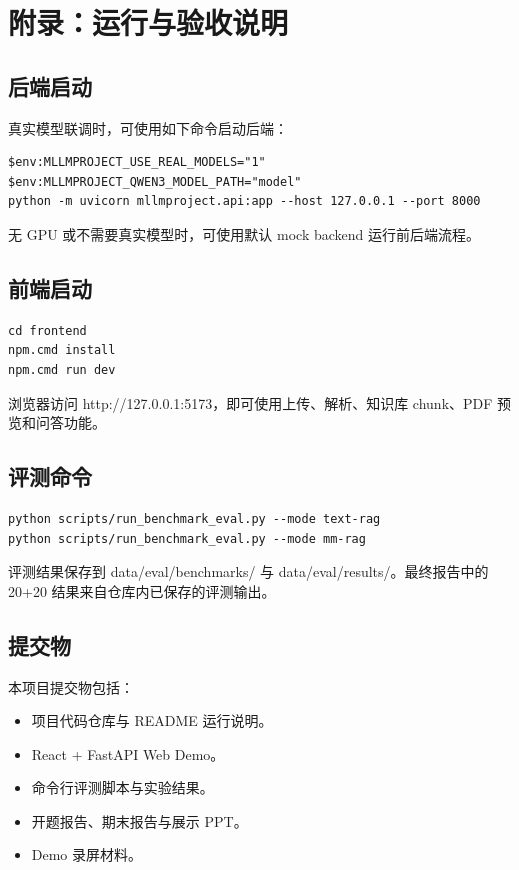 \chapter{附录：运行与验收说明}

\section{后端启动}

真实模型联调时，可使用如下命令启动后端：

\begin{lstlisting}
$env:MLLMPROJECT_USE_REAL_MODELS="1"
$env:MLLMPROJECT_QWEN3_MODEL_PATH="model"
python -m uvicorn mllmproject.api:app --host 127.0.0.1 --port 8000
\end{lstlisting}

无 GPU 或不需要真实模型时，可使用默认 mock backend 运行前后端流程。

\section{前端启动}

\begin{lstlisting}
cd frontend
npm.cmd install
npm.cmd run dev
\end{lstlisting}

浏览器访问 http://127.0.0.1:5173，即可使用上传、解析、知识库 chunk、PDF 预览和问答功能。

\section{评测命令}

\begin{lstlisting}
python scripts/run_benchmark_eval.py --mode text-rag
python scripts/run_benchmark_eval.py --mode mm-rag
\end{lstlisting}

评测结果保存到 data/eval/benchmarks/ 与 data/eval/results/。最终报告中的 20+20 结果来自仓库内已保存的评测输出。

\section{提交物}

本项目提交物包括：

\begin{itemize}
  \item 项目代码仓库与 README 运行说明。
  \item React + FastAPI Web Demo。
  \item 命令行评测脚本与实验结果。
  \item 开题报告、期末报告与展示 PPT。
  \item Demo 录屏材料。
\end{itemize}
